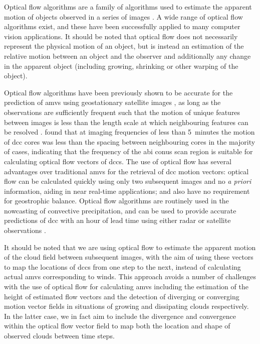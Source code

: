 Optical flow algorithms are a family of algorithms used to estimate the apparent motion of objects observed in a series of images \citep{aggarwal_computation_1988}. 
A wide range of optical flow algorithms exist, and these have been successfully applied to many computer vision applications. 
It should be noted that optical flow does not necessarily represent the physical motion of an object, but is instead an estimation of the relative motion between an object and the observer and additionally any change in the apparent object (including growing, shrinking or other warping of the object). 

Optical flow algorithms have been previously shown to be accurate for the prediction of \acrshort{amv}s using geostationary satellite images \citep{wu_deriving_2016}, as long as the observations are sufficiently frequent such that the motion of unique features between images is less than the length scale at which neighbouring features can be resolved \citep{bresky_feasibility_2006}.
\citet{heikenfeld_tobac_2019} found that at imaging frequencies of less than 5~minutes the motion of \acrshort{dcc} cores was less than the spacing between neighbouring cores in the majority of cases, indicating that the frequency of the \acrshort{abi} \acrshort{conus} scan region is suitable for calculating optical flow vectors of \acrshort{dcc}s.
The use of optical flow has several advantages over traditional \acrshort{amv}s for the retrieval of \acrshort{dcc} motion vectors: optical flow can be calculated quickly using only two subsequent images and no \textit{a priori} information, aiding in near real-time applications; and also have no requirement for geostrophic balance. 
Optical flow algorithms are routinely used in the nowcasting of convective precipitation, and can be used to provide accurate predictions of \acrshort{dcc} with an hour of lead time using either radar or satellite observations \citep[e.g.][]{bowler_development_2004, bechini_enhanced_2017, woo_operational_2017}.

It should be noted that we are using optical flow to estimate the apparent motion of the cloud field between subsequent images, with the aim of using these vectors to map the locations of \acrshort{dcc}s from one step to the next, instead of calculating actual \acrshort{amv}s corresponding to winds.
This approach avoids a number of challenges with the use of optical flow for calculating \acrshort{amv}s including the estimation of the height of estimated flow vectors and the detection of diverging or converging motion vector fields in situations of growing and dissipating clouds respectively.
In the latter case, we in fact aim to include the divergence and convergence within the optical flow vector field to map both the location and shape of observed clouds between time steps.

